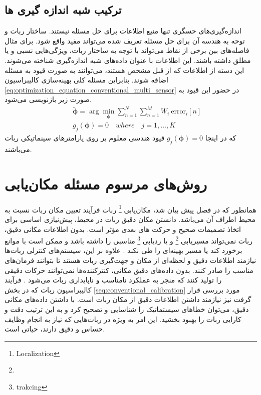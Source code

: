 \subsection{ترکیب شبه اندازه گیری ها}
اندازه‌گیری‌های حسگری تنها منبع اطلاعات برای حل مسئله نیستند. ساختار ربات و توحه به هندسه آن برای حل مسئله تعریف شده می‌تواند مفید واقع شود. برای مثال فاصله‌های بین برخی از نقاط می‌تواند با توجه به ساختار ربات، ویژگی‌هایی نسبی و یا مطلق داشته باشند. این اطلاعات با عنوان داده‌های شبه اندازه‌گیری شناخته می‌شوند. این دسته از اطلاعات که از قبل مشخص هستند، می‌توانند به صورت قیود به مسئله اضافه شوند. بنابراین مسئله کلی بهینه‌سازی کالیبراسیون
\ref{eq:optimization_equation_conventional_multi_sensor}
در حضور این قیود به صورت زیر باز‌نویسی می‌شود. 
\begin{equation}
	\begin{aligned} \label{eq:optimization_equation_conventional_multi_sensor_measurement}
		&\tilde{\boldsymbol{\phi}} =  \arg\min_{\boldsymbol{\phi}} \sum_{n = 1 }^{N} \sum_{n = 1 }^{M} W_i~\text{error}_i[n] \\
		\quad &g_j(\boldsymbol{\phi}) = 0 \quad where \quad j = 1, \ldots, K
	\end{aligned}
\end{equation}
که در اینجا
$g_j(\boldsymbol{\phi}) = 0$ 
قیود هندسی معلوم بر روی پارامترهای سینماتیکی ربات می‌باشند.

\section{روش‌های مرسوم مسئله مکان‌یابی}
همانطور که در فصل پیش بیان شد، مکان‌یابی
\footnote{Localization}
 ربات فرآیند تعیین مکان ربات نسبت به محیط اطراف آن می‌باشد. دانستن مکان دقیق ربات در محیط، پیش‌نیازی اساسی برای اتخاذ تصمیمات صحیح و حرکت های بعدی مؤثر است. بدون اطلاعات مکانی دقیق، ربات نمی‌تواند مسیریابی
\footnote{}
  و یا ردیابی
\footnote{trakcing}
مناسبی را داشته باشد و ممکن است با موانع برخورد کند یا مسیر بهینه‌ای را طی نکند
\cite{ahmad2013cooperative}.
 علاوه بر این، سیستم‌های کنترلی ربات‌ها نیازمند اطلاعات دقیق و لحظه‌ای از مکان و جهت‌گیری ربات هستند تا بتوانند فرمان‌های مناسب را صادر کنند. بدون داده‌های دقیق مکانی، کنترکننده‌ها نمی‌توانند حرکات دقیقی را تولید کنند که منجر به عملکرد نامناسب و ناپایداری ربات می‌شود
\cite{guibas1997robot}.
فرآیند کالیبراسیون ربات که در بخش 
\ref{seq:conventional_calibration}
مورد بررسی قرار گرفت نیز نیازمند داشتن اطلاعات دقیق از مکان ربات است. با داشتن داده‌های مکانی دقیق، می‌توان خطاهای سیستماتیک را شناسایی و تصحیح کرد و به این ترتیب دقت و کارایی ربات را بهبود بخشید. این امر به ویژه در ربات‌هایی که نیاز به انجام وظایف حساس و دقیق دارند، حیاتی است. 

